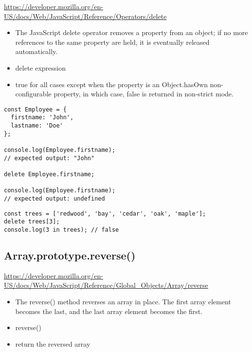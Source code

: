\documentclass[10pt]{article}
\begin{document}
\url{https://developer.mozilla.org/en-US/docs/Web/JavaScript/Reference/Operators/delete}

\begin{itemize}
	\item The JavaScript delete operator removes a property from an object; if no more references to the same property are held, it is eventually released automatically.
	\item delete expression
	\item true for all cases except when the property is an Object.hasOwn non-configurable property, in which case, false is returned in non-strict mode.
\end{itemize}

\begin{lstlisting}[title=Example using delete operator, captionpos=t]
const Employee = {
  firstname: 'John',
  lastname: 'Doe'
};

console.log(Employee.firstname);
// expected output: "John"

delete Employee.firstname;

console.log(Employee.firstname);
// expected output: undefined
\end{lstlisting}

\begin{lstlisting}[title=Example using delete operator, captionpos=t]
const trees = ['redwood', 'bay', 'cedar', 'oak', 'maple'];
delete trees[3];
console.log(3 in trees); // false
\end{lstlisting}

\medskip %






\medskip %
\pagebreak
\subsection{Array.prototype.reverse()}

\url{https://developer.mozilla.org/en-US/docs/Web/JavaScript/Reference/Global_Objects/Array/reverse}

\begin{itemize}
	\item The reverse() method reverses an array in place. The first array element becomes the last, and the last array element becomes the first.

	\item reverse()
	\item return the reversed array
\end{itemize}
\end{document}
